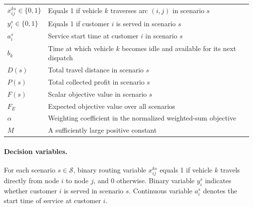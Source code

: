 \documentclass[pdflatex]{sn-jnl}
\begin{document}
\begin{table}
\begin{tabular}{lp{10.8cm}}
$x_{ij}^{ks}\in\{0,1\}$ & Equals 1 if vehicle $k$ traverses arc $(i,j)$ in scenario $s$ \\

$y_i^s\in\{0,1\}$ & Equals 1 if customer $i$ is served in scenario $s$ \\

$a_i^s$ & Service start time at customer $i$ in scenario $s$ \\

$b_k$ & Time at which vehicle $k$ becomes idle and available for its next dispatch \\

$D(s)$ & Total travel distance in scenario $s$ \\

$P(s)$ & Total collected profit in scenario $s$ \\

$F(s)$ & Scalar objective value in scenario $s$ \\

$F_E$ & Expected objective value over all scenarios \\

$\alpha$ & Weighting coefficient in the normalized weighted-sum objective \\

$M$ & A sufficiently large positive constant \\
\bottomrule
\end{tabular}
\end{table}

\paragraph{Decision variables.}
For each scenario $s\in\mathcal{S}$, binary routing variable $x_{ij}^{ks}$ equals 1 if vehicle $k$ travels directly from node $i$ to node $j$, and 0 otherwise.
Binary variable $y_i^s$ indicates whether customer $i$ is served in scenario $s$.
Continuous variable $a_i^s$ denotes the start time of service at customer $i$.
\end{document}
